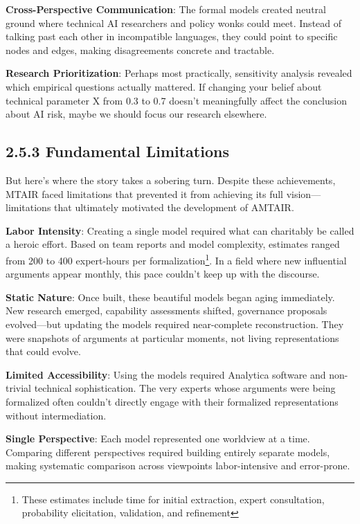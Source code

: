 \documentclass[
  11pt,
  letterpaper,
]{book}
\begin{document}
\textbf{Cross-Perspective Communication}: The formal models created
neutral ground where technical AI researchers and policy wonks could
meet. Instead of talking past each other in incompatible languages, they
could point to specific nodes and edges, making disagreements concrete
and tractable.

\textbf{Research Prioritization}: Perhaps most practically, sensitivity
analysis revealed which empirical questions actually mattered. If
changing your belief about technical parameter X from 0.3 to 0.7 doesn't
meaningfully affect the conclusion about AI risk, maybe we should focus
our research elsewhere.

\subsection{2.5.3 Fundamental Limitations}\label{sec-mtair-limitations}

But here's where the story takes a sobering turn. Despite these
achievements, MTAIR faced limitations that prevented it from achieving
its full vision---limitations that ultimately motivated the development
of AMTAIR.

\textbf{Labor Intensity}: Creating a single model required what can
charitably be called a heroic effort. Based on team reports and model
complexity, estimates ranged from 200 to 400 expert-hours per
formalization\footnote{These estimates include time for initial
  extraction, expert consultation, probability elicitation, validation,
  and refinement}. In a field where new influential arguments appear
monthly, this pace couldn't keep up with the discourse.

\textbf{Static Nature}: Once built, these beautiful models began aging
immediately. New research emerged, capability assessments shifted,
governance proposals evolved---but updating the models required
near-complete reconstruction. They were snapshots of arguments at
particular moments, not living representations that could evolve.

\textbf{Limited Accessibility}: Using the models required Analytica
software and non-trivial technical sophistication. The very experts
whose arguments were being formalized often couldn't directly engage
with their formalized representations without intermediation.

\textbf{Single Perspective}: Each model represented one worldview at a
time. Comparing different perspectives required building entirely
separate models, making systematic comparison across viewpoints
labor-intensive and error-prone.
\end{document}
